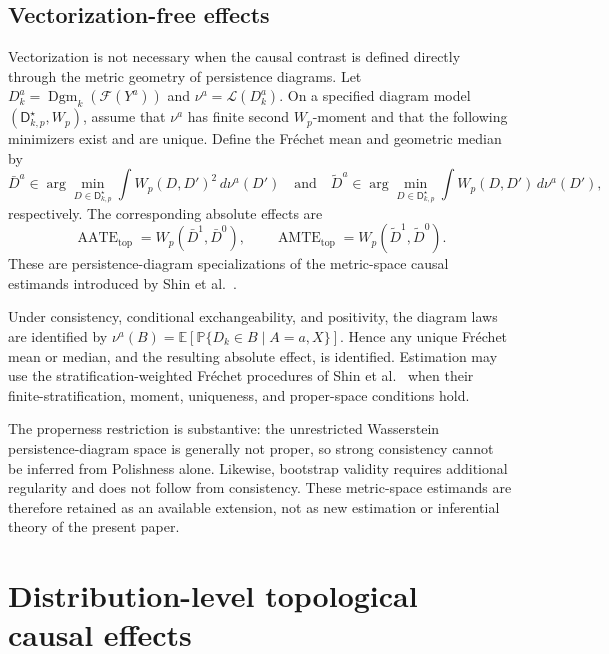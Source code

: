 \documentclass[11pt,a4paper]{article}
\theoremstyle{plain}
\theoremstyle{definition}
\theoremstyle{remark}
\newcommand{\1}{\mathbbm{1}}
\begin{document}
\subsection{Vectorization-free effects}
\label{subsec:frechet-effects}

Vectorization is not necessary when the causal contrast is defined directly through the metric geometry of persistence diagrams. Let \(D_k^a=\operatorname{Dgm}_k(\mathcal F(Y^a))\) and \(\nu^a=\mathcal L(D_k^a)\). On a specified diagram model
\((\mathsf D_{k,p}^{\star},W_p)\), assume that \(\nu^a\) has finite second \(W_p\)-moment and that the following minimizers exist and are unique. Define the Fr\'echet mean and geometric median by
\[
\bar D^a
\in
\arg\min_{D\in\mathsf D_{k,p}^{\star}}
\int W_p(D,D')^2\,d\nu^a(D')
\quad
\text{and}
\quad 
\widetilde D^a
\in
\arg\min_{D\in\mathsf D_{k,p}^{\star}}
\int W_p(D,D')\,d\nu^a(D'),
\]
respectively. The corresponding absolute effects are
\[
\operatorname{AATE}_{\mathrm{top}}
=
W_p(\bar D^1,\bar D^0),
\qquad
\operatorname{AMTE}_{\mathrm{top}}
=
W_p(\widetilde D^1,\widetilde D^0).
\]
These are persistence-diagram specializations of the metric-space causal estimands introduced by Shin et al.~\citep{shinetal2024}.

Under consistency, conditional exchangeability, and positivity, the diagram laws are identified by
\(\nu^a(B) = \mathbb E\left[ \mathbb P\{D_k\in B\mid A=a,X\}
\right]\). Hence any unique Fr\'echet mean or median, and the resulting absolute effect, is identified. Estimation may use the stratification-weighted Fr\'echet procedures of Shin et al.~\citep{shinetal2024} when their finite-stratification, moment, uniqueness, and proper-space conditions hold.

The properness restriction is substantive: the unrestricted
Wasserstein persistence-diagram space is generally not proper, so strong consistency cannot be inferred from Polishness alone. Likewise, bootstrap validity requires additional regularity and does not follow from consistency. These metric-space estimands are therefore retained
as an available extension, not as new estimation or inferential theory of the present paper.


\section{Distribution-level topological causal effects}
\label{sec:distribution-level-tcda}
\end{document}
